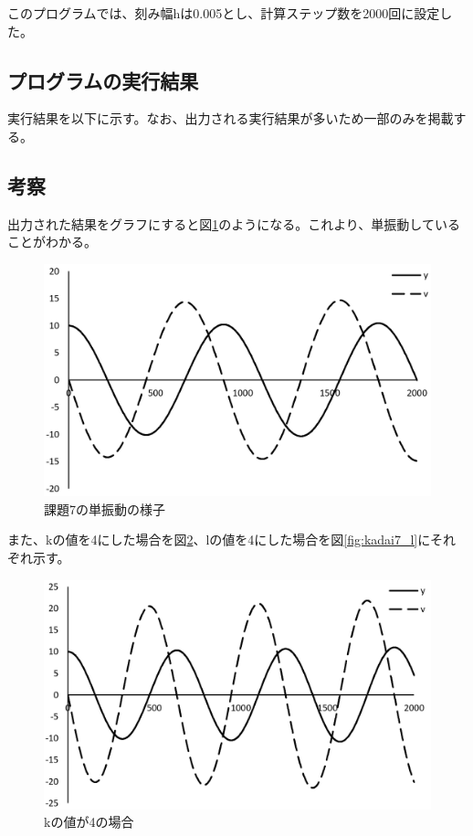 \documentclass[11pt,titlepage]{jsarticle}
\begin{document}
このプログラムでは、刻み幅hは0.005とし、計算ステップ数を2000回に設定した。

\subsection{プログラムの実行結果}
実行結果を以下に示す。なお、出力される実行結果が多いため一部のみを掲載する。
\begin{oframed}
\end{oframed}

\subsection{考察}
出力された結果をグラフにすると図\ref{fig:kadai7}のようになる。これより、単振動していることがわかる。
\begin{figure}[H]
\centering
\includegraphics[width=12cm]{img/kadai7.png}
\caption{課題7の単振動の様子}
\label{fig:kadai7}
\end{figure}

また、kの値を4にした場合を図\ref{fig:kadai7_k}、lの値を4にした場合を図\ref{fig:kadai7_l}にそれぞれ示す。
\begin{figure}[H]
\centering
\includegraphics[width=12cm]{img/kadai7_k.png}
\caption{kの値が4の場合}
\label{fig:kadai7_k}
\end{figure}
\end{document}
